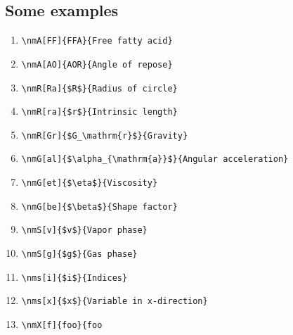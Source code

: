 \subsection{Some examples}
\begin{enumerate}
\item \verb|\nmA[FF]{FFA}{Free fatty acid}|
\item \verb|\nmA[AO]{AOR}{Angle of repose}|
\item \verb|\nmR[Ra]{$R$}{Radius of circle}|
\item \verb|\nmR[ra]{$r$}{Intrinsic length}|
\item \verb|\nmR[Gr]{$G_\mathrm{r}$}{Gravity}|
\item \verb|\nmG[al]{$\alpha_{\mathrm{a}}$}{Angular acceleration}|
\item \verb|\nmG[et]{$\eta$}{Viscosity}|
\item \verb|\nmG[be]{$\beta$}{Shape factor}|
\item \verb|\nmS[v]{$v$}{Vapor phase}|
\item \verb|\nmS[g]{$g$}{Gas phase}|
\item \verb|\nms[i]{$i$}{Indices}|
\item \verb|\nms[x]{$x$}{Variable in x-direction}|
\item \verb|\nmX[f]{foo}{foo|
\end{enumerate} 















